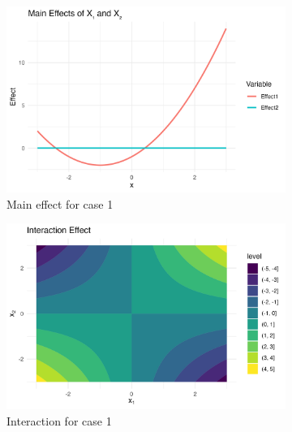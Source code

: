 \begin{figure}[htpb]
    \centering
    \begin{subfigure}[t]{0.49\textwidth}
        \centering
        \includegraphics[width=\textwidth]{images/full_a1p20_a2p00_a11p10_a22p00_a12p05_rhop00_main.png}
        \caption{Main effect for case 1}
    \end{subfigure}%
    \hfill
    \begin{subfigure}[t]{0.49\textwidth}
        \centering
        \includegraphics[width=\textwidth]{images/full_a1p20_a2p00_a11p10_a22p00_a12p05_rhop00_interaction.png}
        \caption{Interaction for case 1}
    \end{subfigure}
    \begin{subfigure}[t]{0.49\textwidth}

\end{subfigure}
\end{figure}
